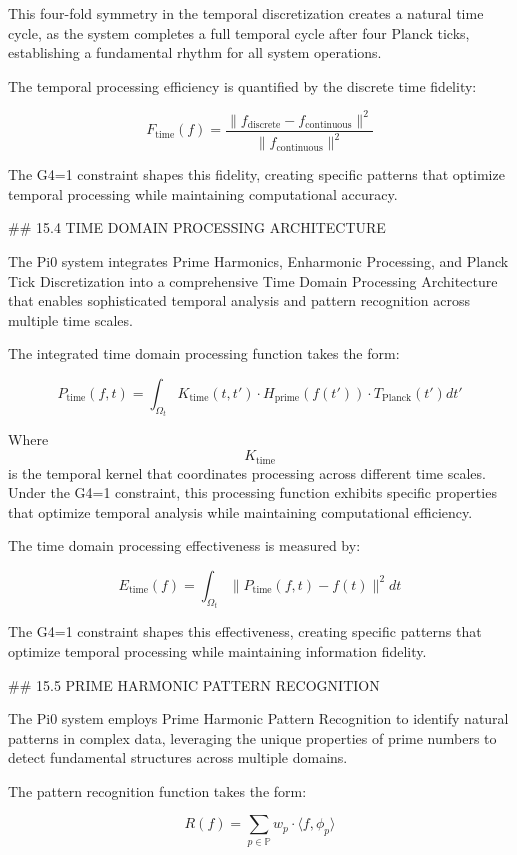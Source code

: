 This four-fold symmetry in the temporal discretization creates a natural time cycle, as the system completes a full temporal cycle after four Planck ticks, establishing a fundamental rhythm for all system operations.

The temporal processing efficiency is quantified by the discrete time fidelity:

$$ F_{\text{time}}(f) = \frac{\|f_{\text{discrete}} - f_{\text{continuous}}\|^2}{\|f_{\text{continuous}}\|^2} $$

The G4=1 constraint shapes this fidelity, creating specific patterns that optimize temporal processing while maintaining computational accuracy.

## 15.4 TIME DOMAIN PROCESSING ARCHITECTURE

The Pi0 system integrates Prime Harmonics, Enharmonic Processing, and Planck Tick Discretization into a comprehensive Time Domain Processing Architecture that enables sophisticated temporal analysis and pattern recognition across multiple time scales.

The integrated time domain processing function takes the form:

$$ P_{\text{time}}(f, t) = \int_{\Omega_t} K_{\text{time}}(t, t') \cdot H_{\text{prime}}(f(t')) \cdot T_{\text{Planck}}(t') dt' $$

Where $$ K_{\text{time}} $$ is the temporal kernel that coordinates processing across different time scales. Under the G4=1 constraint, this processing function exhibits specific properties that optimize temporal analysis while maintaining computational efficiency.

The time domain processing effectiveness is measured by:

$$ E_{\text{time}}(f) = \int_{\Omega_t} \|P_{\text{time}}(f, t) - f(t)\|^2 dt $$

The G4=1 constraint shapes this effectiveness, creating specific patterns that optimize temporal processing while maintaining information fidelity.

## 15.5 PRIME HARMONIC PATTERN RECOGNITION

The Pi0 system employs Prime Harmonic Pattern Recognition to identify natural patterns in complex data, leveraging the unique properties of prime numbers to detect fundamental structures across multiple domains.

The pattern recognition function takes the form:

$$ R(f) = \sum_{p \in \mathbb{P}} w_p \cdot \langle f, \phi_p \rangle $$

